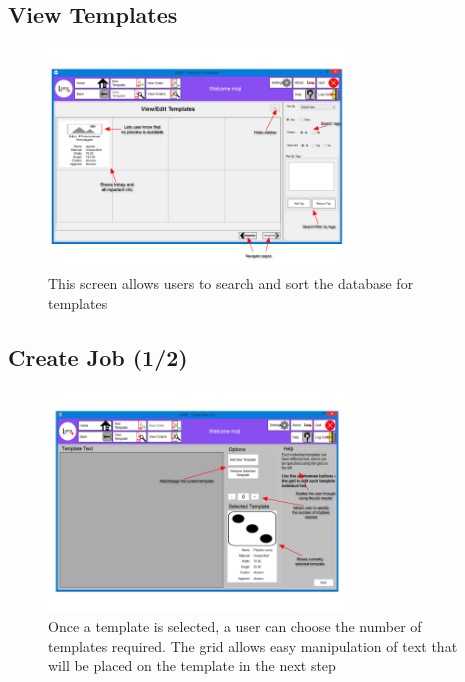 \documentclass[oneside,openany,11pt,a4paper]{report}
\begin{document}
\subsection{View Templates}
\begin{figure}[H]
	\centering
	\includegraphics[width=0.7\textwidth]{screen/templateviewer.png}
	\caption{This screen allows users to search and sort the database for templates}
\end{figure}

\subsection{Create Job (1/2)}
\begin{figure}[H]
	\centering
	\includegraphics[width=0.7\textwidth]{screen/createjob.png}
	\caption{Once a template is selected, a user can choose the number of templates required. The grid allows easy manipulation of text that will be placed on the template in the next step}
\end{figure}
\end{document}
